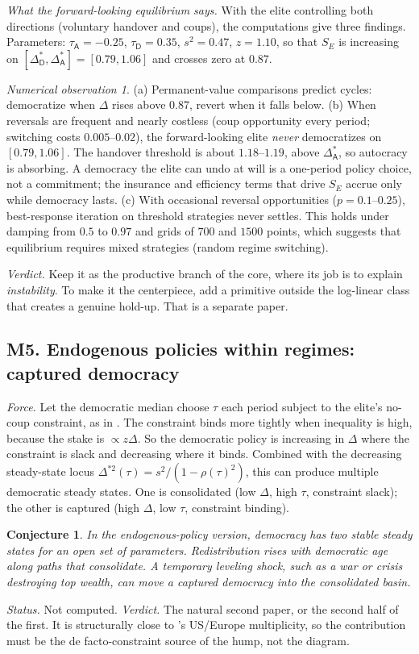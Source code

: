 \documentclass[11pt]{article}
\newtheorem{conjecture}{Conjecture}
\theoremstyle{remark}
\newtheorem{observation}{Numerical observation}
\newcommand{\A}{\mathsf{A}}
\newcommand{\D}{\mathsf{D}}
\begin{document}
\emph{What the forward-looking equilibrium says.}  With the elite controlling both directions (voluntary handover and coups), the computations give three findings.  Parameters: $\tau_\A=-0.25$, $\tau_\D=0.35$, $s^2=0.47$, $z=1.10$, so that $S_E$ is increasing on $[\Delta^*_\D,\Delta^*_\A]=[0.79,1.06]$ and crosses zero at $0.87$.
\begin{observation}\label{obs:productive}
(a) Permanent-value comparisons predict cycles: democratize when $\Delta$ rises above $0.87$, revert when it falls below.  (b) When reversals are frequent and nearly costless (coup opportunity every period; switching costs $0.005$--$0.02$), the forward-looking elite \emph{never} democratizes on $[0.79,1.06]$.  The handover threshold is about $1.18$--$1.19$, above $\Delta^*_\A$, so autocracy is absorbing.  A democracy the elite can undo at will is a one-period policy choice, not a commitment; the insurance and efficiency terms that drive $S_E$ accrue only while democracy lasts.  (c) With occasional reversal opportunities ($p=0.1$--$0.25$), best-response iteration on threshold strategies never settles.  This holds under damping from $0.5$ to $0.97$ and grids of $700$ and $1500$ points, which suggests that equilibrium requires mixed strategies (random regime switching).
\end{observation}
\emph{Verdict.}  Keep it as the productive branch of the core, where its job is to explain \emph{instability}.  To make it the centerpiece, add a primitive outside the log-linear class that creates a genuine hold-up.  That is a separate paper.

\subsection{M5. Endogenous policies within regimes: captured democracy}
\emph{Force.}  Let the democratic median choose $\tau$ each period subject to the elite's no-coup constraint, as in \citet{AcemogluRobinson2008}.  The constraint binds more tightly when inequality is high, because the stake is $\propto z\Delta$.  So the democratic policy is increasing in $\Delta$ where the constraint is slack and decreasing where it binds.  Combined with the decreasing steady-state locus $\Delta^{*2}(\tau)=s^2/(1-\rho(\tau)^2)$, this can produce multiple democratic steady states.  One is consolidated (low $\Delta$, high $\tau$, constraint slack); the other is captured (high $\Delta$, low $\tau$, constraint binding).
\begin{conjecture}
In the endogenous-policy version, democracy has two stable steady states for an open set of parameters.  Redistribution rises with democratic age along paths that consolidate.  A temporary leveling shock, such as a war or crisis destroying top wealth, can move a captured democracy into the consolidated basin.
\end{conjecture}
\emph{Status.}  Not computed.  \emph{Verdict.}  The natural second paper, or the second half of the first.  It is structurally close to \citet{Benabou2000}'s US/Europe multiplicity, so the contribution must be the de facto-constraint source of the hump, not the diagram.
\end{document}
